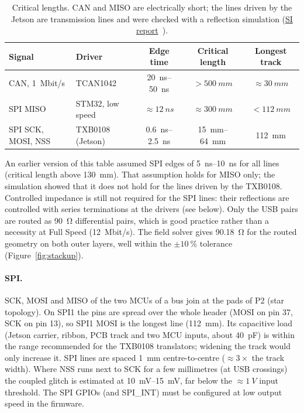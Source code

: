 \documentclass[11pt,a4paper]{article}
\newcommand{\sireport}{\href{run:BYTE_SPIne_SI_Simulation.pdf}{SI report}~\cite{si}}
\begin{document}
\begin{table}[H]
\centering
\begin{tabular}{llccc}
\toprule
Signal & Driver & Edge time & Critical length & Longest track \\
\midrule
CAN, \qty{1}{Mbit/s} & TCAN1042 & \qtyrange{20}{50}{ns} & $>\qty{500}{mm}$ & $\approx\qty{30}{mm}$ \\
SPI MISO & STM32, low speed & $\approx\qty{12}{ns}$ & $\approx\qty{300}{mm}$ & $<\qty{112}{mm}$ \\
SPI SCK, MOSI, NSS & TXB0108 (Jetson) & \qtyrange{0.6}{2.5}{ns} & \qtyrange{15}{64}{mm} & \qty{112}{mm} \\
\bottomrule
\end{tabular}
\caption{Critical lengths. CAN and MISO are electrically short; the lines driven by the Jetson
are transmission lines and were checked with a reflection simulation (\sireport).}
\label{tab:lcrit}
\end{table}

An earlier version of this table assumed SPI edges of \qtyrange{5}{10}{ns} for all lines (critical length
above \qty{130}{mm}). That assumption holds for MISO only; the simulation showed that it does not
hold for the lines driven by the TXB0108. Controlled impedance is still not required for the SPI
lines: their reflections are controlled with series terminations at the drivers (see below). Only
the USB pairs are routed as \qty{90}{\ohm} differential pairs, which is good practice rather than a necessity
at Full Speed (\qty{12}{Mbit/s}). The field solver gives \qty{90.18}{\ohm} for the routed geometry on both outer
layers, well within the $\pm\qty{10}{\percent}$ tolerance (Figure~\ref{fig:stackup}).

\paragraph{SPI.} SCK, MOSI and MISO of the two MCUs of a bus join at the pads of P2 (star topology).
On SPI1 the pins are spread over the whole header (MOSI on pin 37, SCK on pin 13), so SPI1
MOSI is the longest line (\qty{112}{mm}). Its capacitive load (Jetson carrier, ribbon, PCB track and
two MCU inputs, about \qty{40}{pF}) is within the range recommended for the TXB0108 translators;
widening the track would only increase it. SPI lines are spaced \qty{1}{mm} centre-to-centre ($\approx 3\times$ the
track width). Where NSS runs next to SCK for a few millimetres (at USB crossings) the coupled
glitch is estimated at \qtyrange{10}{15}{mV}, far below the $\approx\qty{1}{V}$ input threshold. The SPI GPIOs
(and SPI\_INT) must be configured at low output speed in the firmware.
\end{document}
